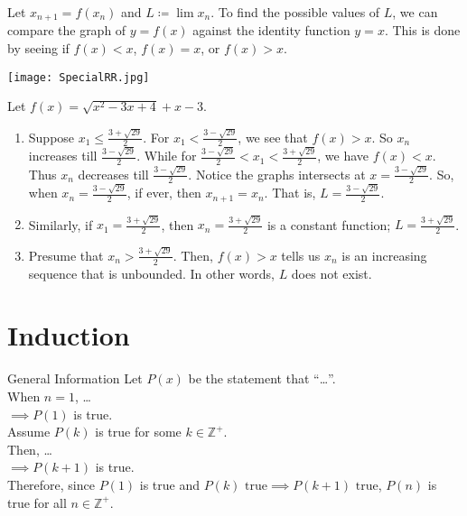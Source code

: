\documentclass[oneside]{book}
\begin{document}
\begin{note}
  Let \(x_{n+1}=f(x_n)\) and \(L\coloneq \lim{x_n}\). To find the possible values of \(L\), we can compare the graph of \(y=f(x)\) against the identity function \(y=x\). This is done by seeing if \(f(x)<x\), \(f(x)=x\), or \(f(x)>x\).
\end{note}
\begin{example}{}{}
  \begin{center}
    \texttt{[image: SpecialRR.jpg]}
  \end{center}
  Let \(f(x)=\sqrt{x^2-3x+4}+x-3\).
  \begin{enumerate}
    \item Suppose \(x_1 \leq \frac{3+\sqrt{29}}{2}\). For \(x_1<\frac{3-\sqrt{29}}{2}\), we see that \(f(x)>x\). So \(x_n\) increases till \(\frac{3-\sqrt{29}}{2}\). While for \(\frac{3-\sqrt{29}}{2}<x_1<\frac{3+\sqrt{29}}{2}\), we have \(f(x)<x\). Thus \(x_n\) decreases till \(\frac{3-\sqrt{29}}{2}\). Notice the graphs intersects at \(x=\frac{3-\sqrt{29}}{2}\). So, when \(x_n=\frac{3-\sqrt{29}}{2}\), if ever, then \(x_{n+1}=x_n\). That is, \(L=\frac{3-\sqrt{29}}{2}\).
    \item Similarly, if \(x_1=\frac{3+\sqrt{29}}{2}\), then \(x_n=\frac{3+\sqrt{29}}{2}\) is a constant function; \(L=\frac{3+\sqrt{29}}{2}\).
    \item Presume that \(x_n>\frac{3+\sqrt{29}}{2}\). Then, \(f(x)>x\) tells us \(x_n\) is an increasing sequence that is unbounded. In other words, \(L\) does not exist.
  \end{enumerate}
\end{example}

\chapter{Induction}
\begin{stbox}{General Information}
  Let \(P(x)\) be the statement that ``\ldots''.\\[3mm] 
  When \(n=1\), \ldots\\[3mm]
  \(\implies P(1)\) is true.\\[3mm]
  Assume \(P(k)\) is true for some \(k \in \mathbb{Z}^{+}\).\\[3mm]
  Then, \ldots\\[3mm]
  \(\implies P(k+1)\) is true.\\[3mm]
  Therefore, since \(P(1)\) is true and \(P(k)\text{ true}\implies P(k+1)\text{ true}\), \(P(n)\) is true for all \(n \in \mathbb{Z}^{+}\).
\end{stbox}
\end{document}
